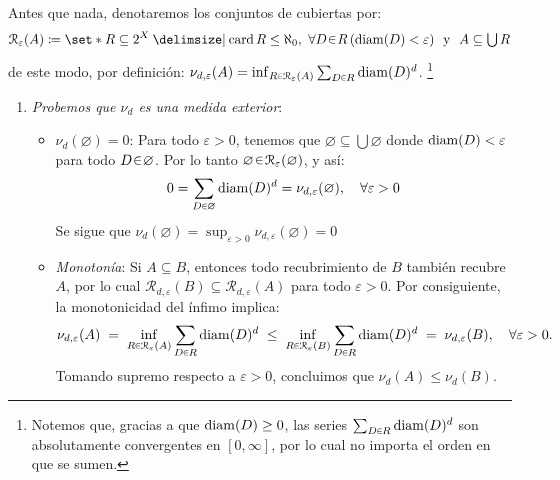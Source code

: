 \begin{sol}
Antes que nada, denotaremos los conjuntos de cubiertas por:
\[
\mathcal{R}_{\varepsilon}(A) \coloneq%
\set*{
    R \subseteq 2^X%
    \given%
    \card R \le \aleph_0,\ %
    \forall D \en R\,%
    ( \diam(D) < \varepsilon)\ %
    \text{ y } \ A \subseteq \textstyle\bigcup R
}
\]
de este modo, por definición: $\nu_{d,\varepsilon}(A) = \inf_{R\en\mathcal{R}_{\varepsilon}(A)} \sum_{D\en R}\diam(D)^d$.%
\footnote{
    Notemos que, gracias a que $\operatorname{diam}(D) \ge 0$, las series $\sum_{D\en R}\diam(D)^d$ son absolutamente convergentes en $[0,\infty]$, por lo cual no importa el orden en que se sumen.
}
\begin{enumerate}[label = (\roman*), leftmargin=1.5em]
\item %
\emph{Probemos que $\nu_d$ es una medida exterior}:
\begin{itemize}[leftmargin=1em]
    \item $\nu_d(\varnothing)=0$: Para todo $\varepsilon>0$, tenemos que $\varnothing \subseteq \bigcup\varnothing$ donde $\operatorname{diam}(D) < \varepsilon$ para todo $D\en\varnothing$. Por lo tanto $\varnothing\en\mathcal{R}_\varepsilon(\varnothing)$, y así:
    \[
    0 = \sum_{D\en\varnothing}\diam(D)^d = \nu_{d,\varepsilon}(\varnothing),%
    \quad\forall \varepsilon>0
    \]
    Se sigue que $\nu_d(\varnothing)=\sup_{\varepsilon>0}\nu_{d,\varepsilon}(\varnothing)=0$

    \item\emph{Monotonía}: Si $A\subseteq B$, entonces todo recubrimiento de $B$ también recubre $A$, por lo cual $\mathcal{R}_{d,\varepsilon}(B) \subseteq \mathcal{R}_{d,\varepsilon}(A)$ para todo $\varepsilon>0$. Por consiguiente, la monotonicidad del ínfimo implica:
    \[
    \nu_{d,\varepsilon}(A)
    \;=\; \inf_{R\en\mathcal{R}_{\varepsilon}(A)} \sum_{D\en R}\diam(D)^d
    \;\le\; \inf_{R\en\mathcal{R}_{\varepsilon}(B)} \sum_{D\en R}\diam(D)^d
    \;=\; \nu_{d,\varepsilon}(B),
    \quad \forall\varepsilon>0.
    \]
    Tomando supremo respecto a $\varepsilon>0$, concluimos que $\nu_d(A)\le \nu_d(B)$.


\end{itemize}
\end{enumerate}
\end{sol}
